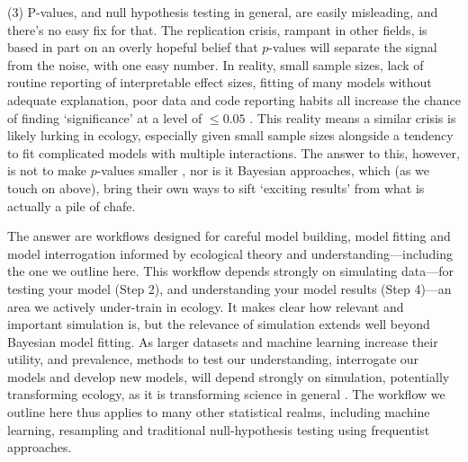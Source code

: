 \documentclass[11pt]{article}
\begin{document}
(3) P-values, and null hypothesis testing in general, are easily misleading, and there’s no easy fix for that. The replication crisis, rampant in other fields, is based in part on an overly hopeful belief that $p$-values will separate the signal from the noise, with one easy number. In reality, small sample sizes, lack of routine reporting of interpretable effect sizes, fitting of many models without adequate explanation, poor data and code reporting habits all increase the chance of finding `significance' at a level of $\le0.05$ \citep{halsey2015,loken2017}. This reality means a similar crisis is likely lurking in ecology, especially given small sample sizes alongside a tendency to fit complicated models with multiple interactions. The answer to this, however, is not to make $p$-values smaller \citep{halsey2015,colquhoun2017}, nor is it Bayesian approaches, which (as we touch on above), bring their own ways to sift `exciting results' from what is actually a pile of chafe. %

The answer are workflows designed for careful model building, model fitting and model interrogation informed by ecological theory and understanding---including the one we outline here. %
This workflow depends strongly on simulating data---for testing your model (Step 2), and understanding your model results (Step 4)---an area we actively under-train in ecology. It makes clear how relevant and important simulation is, but the relevance of simulation extends well beyond Bayesian model fitting. As larger datasets and machine learning increase their utility, and prevalence, methods to test our understanding, interrogate our models and develop new models, will depend strongly on simulation, potentially transforming ecology, as it is transforming science in general \citep{flynn2022digitaltwin,kuntz2022,oren2017}. The workflow we outline here thus applies to many other statistical realms, including machine learning, resampling and traditional null-hypothesis testing using frequentist approaches.
\end{document}
